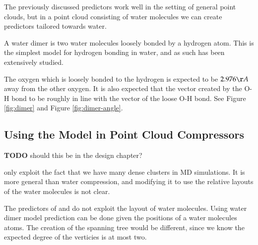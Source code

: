 \documentclass{report}
\newcommand{\todo}{\textbf{TODO} }
\begin{document}
The previously discussed predictors work well in the setting of general point
clouds, but in a point cloud consisting of water molecules we can create
predictors tailored towards water.

A water dimer is two water molecules loosely bonded by a hydrogen atom. This
is the simplest model for hydrogen bonding in water, and as such has been
extensively studied.

The oxygen which is loosely bonded to the hydrogen is expected to be
$2.976\AA$ away from the other oxygen. It is also expected that the vector
created by the O-H bond to be roughly in line with the vector of the loose O-H
bond. See Figure \ref{fig:dimer} and Figure \ref{fig:dimer-angle}.

\subsection{Using the Model in Point Cloud Compressors}

\todo should this be in the design chapter?

\citep{omeltchenko2000sls} only exploit the fact that we have many dense
clusters in MD simulations. It is more general than water compression, and
modifying it to use the relative layouts of the water molecules is not clear.

The predictors of \citep{merrycomp} and \citep{gumholdcomp} do not exploit the
layout of water molecules. Using water dimer model prediction can be done
given the positions of a water molecules atoms. The creation of the spanning
tree would be different, since we know the expected degree of the verticies is
at most two.
\end{document}

